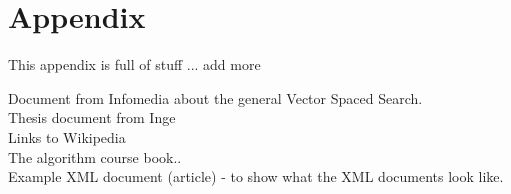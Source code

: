 \chapter{Appendix}

This appendix is full of stuff ... add more

Document from Infomedia about the general Vector Spaced Search.\\
Thesis document from Inge\\
Links to Wikipedia\\
The algorithm course book..\\
Example XML document (article) - to show what the XML documents look like.